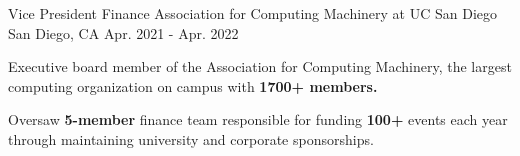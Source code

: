 
\begin{cventries}

\cventry
{Vice President Finance} %
{Association for Computing Machinery at UC San Diego} %
{San Diego, CA} %
{Apr. 2021 - Apr. 2022} %
{
  \begin{cvitems} %
    \item {Executive board member of the Association for Computing Machinery, the largest computing organization on campus with \textbf{1700+ members.}}
    \item {Oversaw \textbf{5-member} finance team responsible for funding \textbf{100+} events each year through maintaining university and corporate sponsorships. }
  \end{cvitems}
}

\end{cventries}
